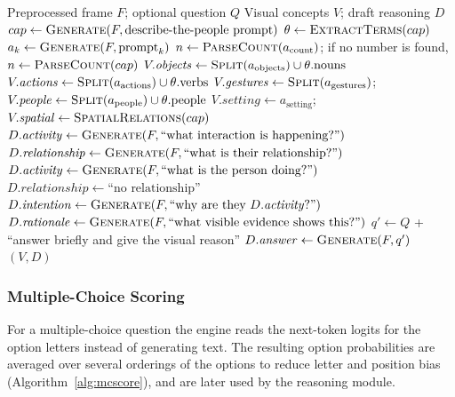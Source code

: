 \begin{algorithm}[H]
\caption{Visual Understanding and Draft Reasoning with SmolVLM}
\label{alg:vlm}
\begin{algorithmic}[1]
\Require Preprocessed frame $F$; optional question $Q$
\Ensure Visual concepts $V$; draft reasoning $D$
\State $cap \gets \textsc{Generate}(F, \text{describe-the-people prompt})$
\State $\theta \gets \textsc{ExtractTerms}(cap)$ 
  \State $a_k \gets \textsc{Generate}(F, \text{prompt}_k)$
\EndFor
\State $n \gets \textsc{ParseCount}(a_{\text{count}})$; if no number is found, $n \gets \textsc{ParseCount}(cap)$
\State $V.\mathit{objects} \gets \textsc{Split}(a_{\text{objects}}) \cup \theta.\text{nouns}$
\State $V.\mathit{actions} \gets \textsc{Split}(a_{\text{actions}}) \cup \theta.\text{verbs}$
\State $V.\mathit{gestures} \gets \textsc{Split}(a_{\text{gestures}})$;\; $V.\mathit{people} \gets \textsc{Split}(a_{\text{people}}) \cup \theta.\text{people}$
\State $V.\mathit{setting} \gets a_{\text{setting}}$;\; $V.\mathit{spatial} \gets \textsc{SpatialRelations}(cap)$
  \State $D.\mathit{activity} \gets \textsc{Generate}(F, \text{``what interaction is happening?''})$
  \State $D.\mathit{relationship} \gets \textsc{Generate}(F, \text{``what is their relationship?''})$
\Else
  \State $D.\mathit{activity} \gets \textsc{Generate}(F, \text{``what is the person doing?''})$
  \State $D.\mathit{relationship} \gets \text{``no relationship''}$
\EndIf
\State $D.\mathit{intention} \gets \textsc{Generate}(F, \text{``why are they } D.\mathit{activity}\text{?''})$
\State $D.\mathit{rationale} \gets \textsc{Generate}(F, \text{``what visible evidence shows this?''})$
  \State $q' \gets Q$ + ``answer briefly and give the visual reason''
  \State $D.\mathit{answer} \gets \textsc{Generate}(F, q')$
\EndIf
\State \Return $(V, D)$
\end{algorithmic}
\end{algorithm}

\subsubsection{Multiple-Choice Scoring}
For a multiple-choice question the engine reads the next-token logits for the option letters instead of generating text. The resulting option probabilities are averaged over several orderings of the options to reduce letter and position bias (Algorithm~\ref{alg:mcscore}), and are later used by the reasoning module.

